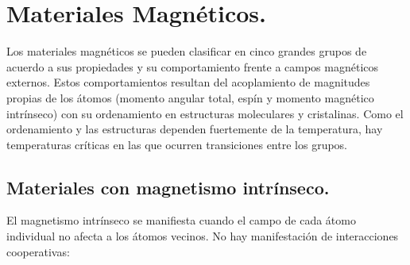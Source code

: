 
\chapter{Materiales Magnéticos.} %

\label{AppendixMaterialesMagneticos} %


Los materiales magnéticos se pueden clasificar en cinco grandes grupos de acuerdo a sus propiedades y su comportamiento frente a campos magnéticos externos. Estos comportamientos resultan del acoplamiento de magnitudes propias de los átomos (momento angular total, espín y momento magnético intrínseco) con su ordenamiento en estructuras moleculares y cristalinas. Como el ordenamiento y las estructuras dependen fuertemente de la temperatura, hay temperaturas críticas en las que ocurren transiciones entre los grupos. 

\section{Materiales con magnetismo intrínseco.}

El magnetismo intrínseco se manifiesta cuando el campo de cada átomo individual no afecta a los átomos vecinos. No hay manifestación de interacciones cooperativas:

